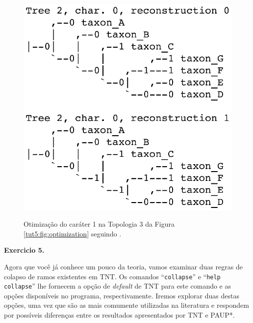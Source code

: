 \begin{refsection}
  \begin{figure}[H]
      {\includegraphics[scale=0.70]{figures/tut5/reconstrucao_tnt.eps}}
	{\caption[\textcite{Coddington_and_Scharff_1994} reconstrução]{Otimização do caráter 1 na Topologia 3 da Figura \ref{tut5:fig:optimization} seguindo \textcite{Coddington_and_Scharff_1994}.}\label{tut5:fig:recons}} 
  \end{figure}


\begin{blackBlock}{\textbf{Exercicio 5.}}\label{tut4:ex:5.3}

Agora que você já conhece um pouco da teoria, vamos examinar duas regras de colapso de ramos existentes em TNT. Os comandos ``\texttt{collapse}'' e ``\texttt{help collapse}'' lhe fornecem a opção de \textit{default} de TNT para este comando e as opções disponíveis no programa, respectivamente. Iremos explorar duas destas opções, uma vez que são as mais comumente utilizadas na literatura e respondem por possíveis diferenças entre os resultados apresentados por TNT e PAUP*.


\end{blackBlock}
\end{refsection}
